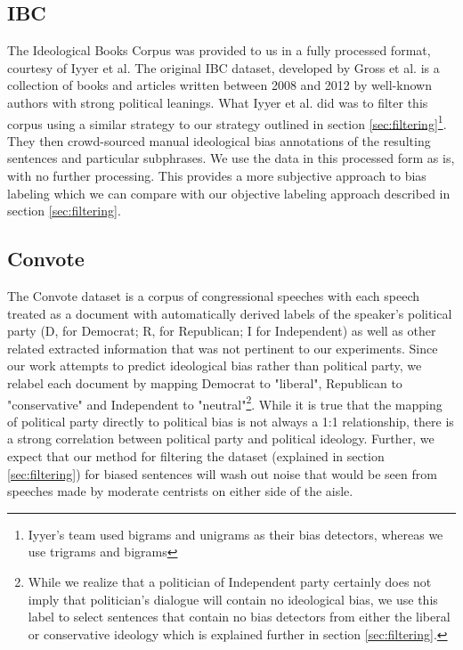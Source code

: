 \documentclass[10pt,a4paper,onecolumn]{article}
\begin{document}
\subsection{IBC}
The Ideological Books Corpus was provided to us in a fully processed format, courtesy of Iyyer et al.\cite{iyyerRNN} The original IBC dataset, developed by Gross et al.\cite{gross2013ibc} is a collection of books and articles written between 2008 and 2012 by well-known authors with strong political leanings. What Iyyer et al. did was to filter this corpus using a similar strategy to our strategy outlined in section \ref{sec:filtering}\footnote{Iyyer's team used bigrams and unigrams as their bias detectors, whereas we use trigrams and bigrams}. They then crowd-sourced manual ideological bias annotations of the resulting sentences and particular subphrases. We use the data in this processed form as is, with no further processing. This provides a more subjective approach to bias labeling which we can compare with our objective labeling approach described in section \ref{sec:filtering}.

\subsection{Convote}
The Convote dataset is a corpus of congressional speeches with each speech treated as a document with automatically derived labels of the speaker's political party (D, for Democrat; R, for Republican; I for Independent) as well as other related extracted information that was not pertinent to our experiments. Since our work attempts to predict ideological bias rather than political party, we relabel each document by mapping Democrat to "liberal", Republican to "conservative" and Independent to "neutral"\footnote{While we realize that a politician of Independent party certainly does not imply that politician's dialogue will contain no ideological bias, we use this label to select sentences that contain no bias detectors from either the liberal or conservative ideology which is explained further in section \ref{sec:filtering}.}. While it is true that the mapping of political party directly to political bias is not always a 1:1 relationship, there is a strong correlation between political party and political ideology. Further, we expect that our method for filtering the dataset (explained in section \ref{sec:filtering}) for biased sentences will wash out noise that would be seen from speeches made by moderate centrists on either side of the aisle.
\end{document}
